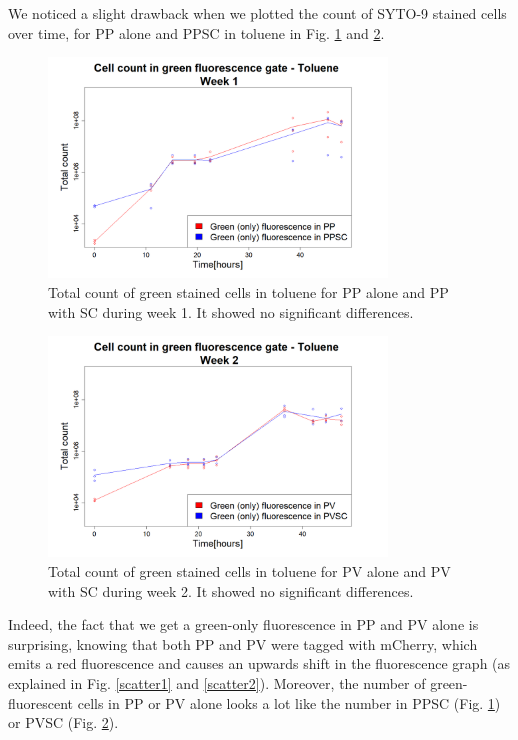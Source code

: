 \documentclass[a4paper, 10pt, conference]{ieeeconf}   %
\begin{document}
We noticed a slight drawback when we plotted the count of SYTO-9 stained cells over time, for PP alone and PPSC in toluene in Fig. \ref{problemw1} and \ref{problemw2}. 

\begin{figure}
		\centering
		\includegraphics[width=9cm]{problemw1.PNG}
		\caption{Total count of green stained cells in toluene for PP alone and PP with SC during week 1. It showed no significant differences.}
		\label{problemw1}
\end{figure}

\begin{figure}
		\centering
		\includegraphics[width=9cm]{problemw2.PNG}
		\caption{Total count of green stained cells in toluene for PV alone and PV with SC during week 2. It showed no significant differences.}
		\label{problemw2}

  
\end{figure}

 Indeed, the fact that we get a green-only fluorescence in PP and PV alone is surprising, knowing that both PP and PV were tagged with mCherry, which emits a red fluorescence and causes an upwards shift in the fluorescence graph (as explained in Fig. \ref{scatter1} and \ref{scatter2}). Moreover, the number of green-fluorescent cells in PP or PV alone looks a lot like the number in PPSC (Fig. \ref{problemw1}) or PVSC (Fig. \ref{problemw2}).
 
\end{document}
